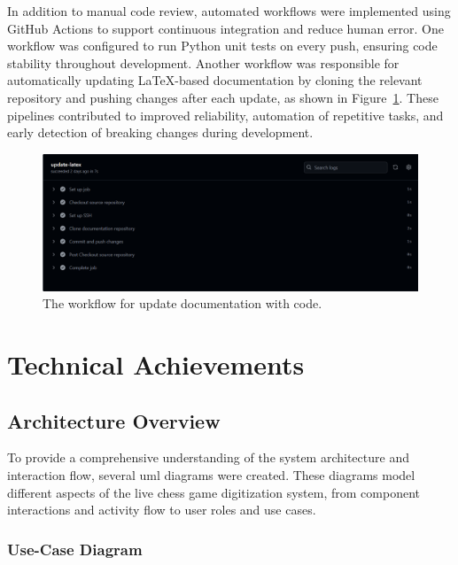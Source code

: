 In addition to manual code review, automated workflows were implemented using GitHub Actions to support continuous integration and reduce human error. One workflow was configured to run Python unit tests on every push, ensuring code stability throughout development. Another workflow was responsible for automatically updating LaTeX-based documentation by cloning the relevant repository and pushing changes after each update, as shown in Figure~\ref{fig:workflow-latex}. These pipelines contributed to improved reliability, automation of repetitive tasks, and early detection of breaking changes during development. \\

\begin{figure}[h!] \centering 
\includegraphics[width=0.75\linewidth]{figures/results/workflows/latex.png}\caption[Upload LaTeX workflow]{The workflow for update documentation with code.}\label{fig:workflow-latex} \end{figure}



\section{Technical Achievements}

\subsection{Architecture Overview}
\label{subsec:diagrams}

To provide a comprehensive understanding of the system architecture and interaction flow, several \gls{uml} diagrams were created. These diagrams model different aspects of the live chess game digitization system, from component interactions and activity flow to user roles and use cases.



\subsubsection*{Use-Case Diagram}
\label{subsubsec:use-case-diagram}

